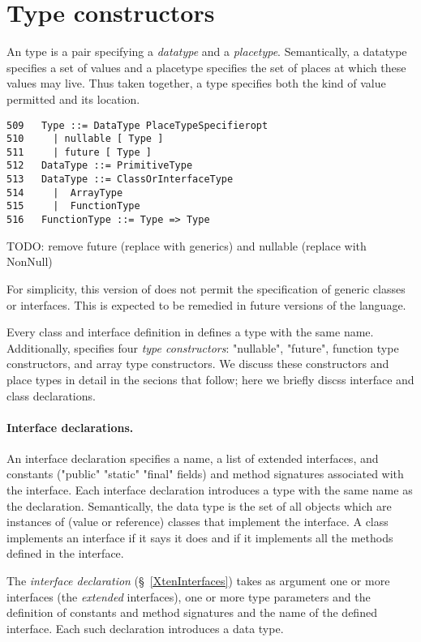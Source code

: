 \section{Type constructors}\label{TypeConstructors}

An \Xten{} type is a pair specifying a {\em datatype} and a {\em
placetype}. Semantically, a datatype specifies a set of values and a
placetype specifies the set of places at which these values may
live. Thus taken together, a type specifies both the kind of value
permitted and its location. 

\begin{verbatim}
509   Type ::= DataType PlaceTypeSpecifieropt
510     | nullable [ Type ]
511     | future [ Type ] 
512   DataType ::= PrimitiveType
513   DataType ::= ClassOrInterfaceType
514     |  ArrayType
515     |  FunctionType
516   FunctionType ::= Type => Type
\end{verbatim}

TODO: remove future (replace with generics) and nullable
(replace with NonNull)

For simplicity, this version of \Xten{} does not permit the
specification of generic classes or interfaces. This is expected to be
remedied in future versions of the language.

Every class and interface definition in \Xten{} defines a type with
the same name. Additionally, {}\Xten{} specifies four {\em type
constructors}: \xcd"nullable", \xcd"future", function type
constructors, and array type
constructors. We discuss these constructors and place types in detail
in the secions that follow; here we briefly discss interface and class
declarations.

\paragraph{Interface declarations.}\label{InterfaceTypes}
An interface declaration specifies a name, a list of extended
interfaces, and constants (\xcd"public" \xcd"static" \xcd"final" fields) and
method signatures associated with the interface. Each interface
declaration introduces a type with the same name as the declaration.
Semantically, the data type is the set of all objects which are
instances of (value or reference) classes that implement the
interface. A class implements an interface if it says it does and if
it implements all the methods defined in the interface.


The {\em interface declaration} (\S~\ref{XtenInterfaces}) takes as
argument one or more interfaces (the {\em extended} interfaces), one
or more type parameters and the definition of constants and method
signatures and the name of the defined interface.  Each such
declaration introduces a data type.

